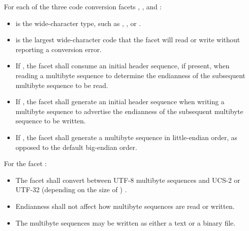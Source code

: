 \documentclass{wg21}
\begin{document}
\pnum
For each of the three code conversion facets ,
, and :
\begin{itemize}
    \item
     is the wide-character type, such as
    , , or .
    \item
     is the largest wide-character code that the facet
    will read or write without reporting a conversion error.
    \item
    If , the facet shall consume an
    initial header sequence, if present, when reading a multibyte sequence
    to determine the endianness of the subsequent multibyte sequence to be read.
    \item
    If , the facet shall generate an
    initial header sequence when writing a multibyte sequence to advertise
    the endianness of the subsequent multibyte sequence to be written.
    \item
    If , the facet shall generate a
    multibyte sequence in little-endian order,
    as opposed to the default big-endian order.

\end{itemize}

\pnum
{}%
%
%
For the facet :
\begin{itemize}
    \item
    The facet shall convert between UTF-8 multibyte sequences
    and UCS-2 or UTF-32 (depending on the size of )
    .
    \item
    Endianness shall not affect how multibyte sequences are read or written.
    \item
    The multibyte sequences may be written as either a text or a binary file.
\end{itemize}
\end{document}
